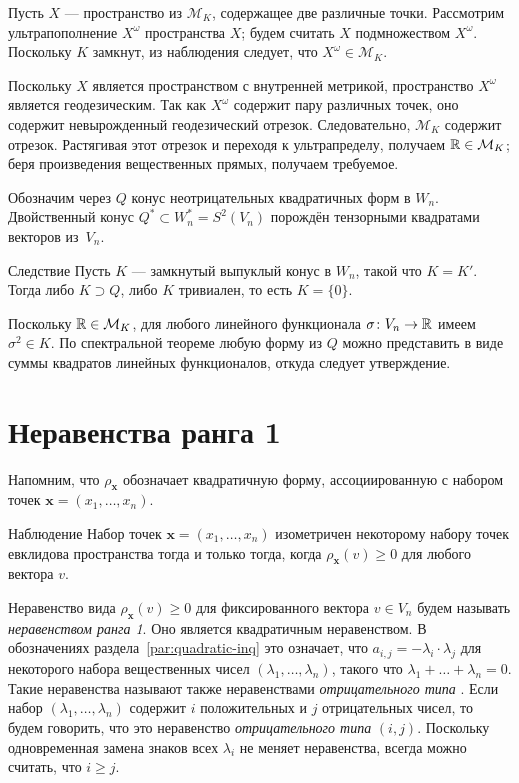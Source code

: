 Пусть $X$ --- пространство из $\mathcal{M}_K$, содержащее две различные точки.
Рассмотрим ультрапополнение $X^\omega$ пространства $X$;
будем считать $X$ подмножеством $X^\omega$.
Поскольку $K$ замкнут, из наблюдения следует, что $X^\omega\in \mathcal{M}_K$.

Поскольку $X$ является пространством с внутренней метрикой, пространство $X^\omega$ является геодезическим.
Так как $X^\omega$
содержит пару различных точек, оно содержит невырожденный геодезический отрезок.
Следовательно, $\mathcal{M}_K$ содержит отрезок.
Растягивая этот отрезок и переходя к ультрапределу, получаем $\mathbb{R}\in \mathcal{M}_K$;
беря произведения вещественных прямых, получаем требуемое.
\qeds

Обозначим через $Q$ конус неотрицательных квадратичных форм в $W_n$.
Двойственный конус $Q^*\subset W_n^*=S^2(V_n)$ порождён тензорными квадратами векторов из~$V_n$.

\begin{thm}{Следствие}
Пусть $K$ --- замкнутый выпуклый конус в $W_n$, такой что $K=K'$.
Тогда либо $K\supset Q$, либо $K$ тривиален, то есть $K=\{0\}$.
\end{thm}

Поскольку $\mathbb{R}\in \mathcal{M}_K$, для любого линейного функционала $\sigma\colon V_n\to\mathbb{R}$ имеем $\sigma^2\in K$.
По спектральной теореме любую форму из $Q$ можно представить в виде суммы квадратов линейных функционалов, откуда следует утверждение.
\qeds

\section{Неравенства ранга 1}\label{par:rank-one}
Напомним, что $\rho_{\bm{x}}$ обозначает квадратичную форму, ассоциированную с набором точек $\bm{x}=(x_1,\ldots,x_n)$.

\begin{thm}{Наблюдение}\label{obs:rank-one}
Набор точек $\bm{x}=(x_1,\ldots,x_n)$ изометричен некоторому набору точек евклидова пространства тогда и только тогда, когда $\rho_{\bm{x}}(v)\geqslant 0$ для любого вектора $v$.
\end{thm}

Неравенство вида $\rho_{\bm{x}}(v)\geqslant 0$ для фиксированного вектора $v\in V_n$ будем называть \emph{неравенством ранга 1}.
Оно является квадратичным неравенством.
В обозначениях раздела~\ref{par:quadratic-inq} это означает, что $a_{i,j}=-\lambda_i\cdot\lambda_j$ для некоторого набора вещественных чисел $(\lambda_1,\ldots, \lambda_n)$, такого что
$\lambda_1+\ldots+\lambda_n=0$.
Такие неравенства называют также неравенствами \emph{отрицательного типа} \cite{deza-lauren}.
Если набор $(\lambda_1,\ldots, \lambda_n)$ содержит $i$ положительных и $j$ отрицательных чисел,
то будем говорить, что это неравенство \emph{отрицательного типа} $(i,j)$.
Поскольку одновременная замена знаков всех $\lambda_i$ не меняет неравенства, всегда можно считать, что $i\geqslant j$.

